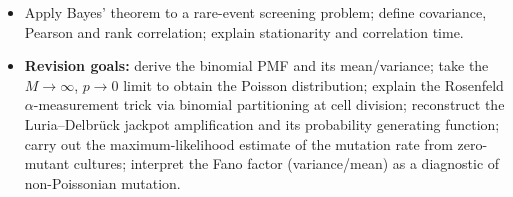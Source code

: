 \begin{itemize}[nosep]
\item Apply Bayes' theorem to a rare-event screening problem; define covariance, Pearson and rank correlation; explain stationarity and correlation time.
\item \textbf{Revision goals:} derive the binomial PMF and its mean/variance; take the $M\to\infty$, $p\to0$ limit to obtain the Poisson distribution; explain the Rosenfeld $\alpha$-measurement trick via binomial partitioning at cell division; reconstruct the Luria--Delbr{\"u}ck jackpot amplification and its probability generating function; carry out the maximum-likelihood estimate of the mutation rate from zero-mutant cultures; interpret the Fano factor (variance/mean) as a diagnostic of non-Poissonian mutation.
\end{itemize}

